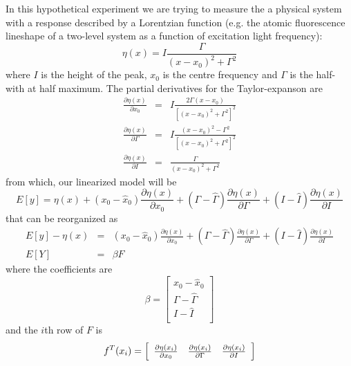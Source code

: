 \documentclass[12pt]{iopart}
\begin{document}
In this hypothetical experiment we are trying to measure the a physical system with a response described by a Lorentzian function (e.g. the atomic fluorescence lineshape of a two-level system as a function of excitation light frequency):
\begin{equation}
\eta(x) = I \frac{\Gamma}{(x - x_0)^2 + \Gamma^2}
\label{eq:lorentz3}
\end{equation}
where $I$ is the height of the peak, $x_0$ is the centre frequency and $\Gamma$ is the half-with at half maximum. The partial derivatives for the Taylor-expanson are
\begin{eqnarray}
\frac{\partial \eta(x)}{\partial x_0} &=& I \frac{2 \Gamma (x - x_0)}{\left[(x - x_0)^2 + \Gamma^2\right]^2} \\
\frac{\partial \eta(x)}{\partial \Gamma} &=& I \frac{(x - x_0)^2 - \Gamma^2}{\left[(x - x_0)^2 + \Gamma^2\right]^2} \\
\frac{\partial \eta(x)}{\partial I} &=& \frac{\Gamma}{(x - x_0)^2 + \Gamma^2}
\end{eqnarray}
from which, our linearized model will be
\begin{equation}
E[y] = \eta(x) + (x_0 - \hat x_0) \frac{\partial \eta(x)}{\partial x_0} + (\Gamma - \hat \Gamma) \frac{\partial \eta(x)}{\partial \Gamma} + (I - \hat I) \frac{\partial \eta(x)}{\partial I}
\end{equation}
that can be reorganized as
\begin{eqnarray}
E[y] - \eta(x) &=& (x_0 - \hat x_0) \frac{\partial \eta(x)}{\partial x_0} + (\Gamma - \hat \Gamma) \frac{\partial \eta(x)}{\partial \Gamma} + (I - \hat I) \frac{\partial \eta(x)}{\partial I}  \nonumber \\
E[Y] &=& \beta F
\end{eqnarray}
where the coefficients are
\begin{equation}
\beta = \left[
  \begin{array}{l}
    x_0 - \hat x_0 \\
    \Gamma - \hat \Gamma\\
    I - \hat I \\
  \end{array} \right ]
\end{equation}
 and the $i$th row of $F$ is
\begin{equation}
 f^T(x_i) = \left[
  \begin{array}{l l l}
   \frac{\partial \eta(x_i)}{\partial x_0} & \frac{\partial \eta(x_i)}{\partial \Gamma} & \frac{\partial \eta(x_i)}{\partial I}
  \end{array} \right ]
\end{equation}
\end{document}
